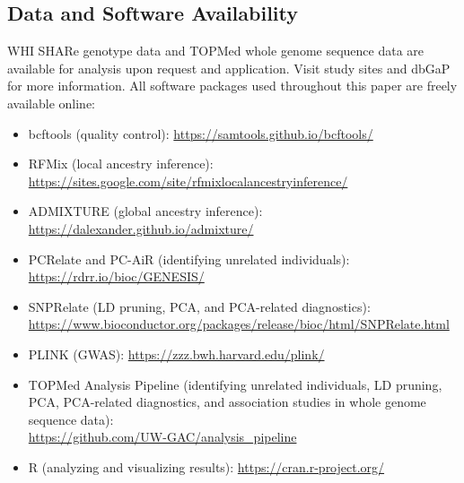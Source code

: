 \documentclass[12pt]{article}
\newcommand{\edit}[1]{{\color{red}{#1}}}
\begin{document}
\subsection{Data and Software Availability}

WHI SHARe genotype data and TOPMed whole genome sequence data are available for analysis upon request and application. Visit study sites and dbGaP for more information.
All software packages used throughout this paper are freely available online: 


\begin{itemize}
\item bcftools \citep{bcftools} (quality control): \href{https://samtools.github.io/bcftools/}{https://samtools.github.io/bcftools/}
\item RFMix \citep{rfmix} (local ancestry inference):  \href{https://sites.google.com/site/rfmixlocalancestryinference/}{https://sites.google.com/site/rfmixlocalancestryinference/}
\item ADMIXTURE \citep{admixture} (global ancestry inference): \href{https://dalexander.github.io/admixture/}{https://dalexander.github.io/admixture/}
\item PCRelate \citep{conomos2016related} and PC-AiR \citep{conomos2015}
 (identifying unrelated individuals): \href{https://rdrr.io/bioc/GENESIS/}{https://rdrr.io/bioc/GENESIS/}
\item SNPRelate \citep{snprelate} (LD pruning, PCA, and PCA-related diagnostics): \\ \href{https://www.bioconductor.org/packages/release/bioc/html/SNPRelate.html}{https://www.bioconductor.org/packages/release/bioc/html/SNPRelate.html} 
\item PLINK \citep{plink} (GWAS): \href{https://zzz.bwh.harvard.edu/plink/}{https://zzz.bwh.harvard.edu/plink/}
\item TOPMed Analysis Pipeline (identifying unrelated individuals, LD pruning, PCA,  PCA-related diagnostics, and association studies in whole genome sequence data): \\ \href{https://github.com/UW-GAC/analysis_pipeline}{https://github.com/UW-GAC/analysis\_pipeline}
\item R (analyzing and visualizing results): \href{https://cran.r-project.org/}{https://cran.r-project.org/}
\end{itemize}
\end{document}
